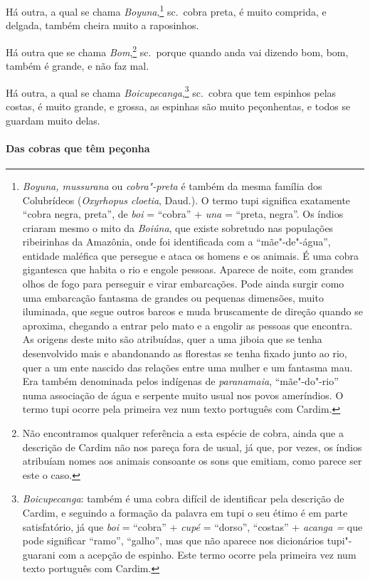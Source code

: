  Há outra, a qual se chama \textit{Boyuna},\footnote{ \textit{Boyuna,
mussurana} ou \textit{cobra"-preta} é também da mesma família dos
Colubrídeos (\textit{Oxyrhopus cloetia}, Daud.). O termo tupi significa
exatamente ``cobra negra, preta'', de \textit{boi} = ``cobra'' +
\textit{una} = ``preta, negra''. Os índios criaram mesmo o mito da
\textit{Boiúna}, que existe sobretudo nas populações ribeirinhas da
Amazônia, onde foi identificada com a ``mãe"-de"-água'', entidade maléfica
que persegue e ataca os homens e os animais. É uma cobra gigantesca que
habita o rio e engole pessoas. Aparece de noite, com grandes olhos de
fogo para perseguir e virar embarcações. Pode ainda surgir como uma
embarcação fantasma de grandes ou pequenas dimensões, muito iluminada,
que segue outros barcos e muda bruscamente de direção quando se
aproxima, chegando a entrar pelo mato e a engolir as pessoas que
encontra. As origens deste mito são atribuídas, quer a uma jiboia que
se tenha desenvolvido mais e abandonando as florestas se tenha fixado
junto ao rio, quer a um ente nascido das relações entre uma mulher e um
fantasma mau. Era também denominada pelos indígenas de
\textit{paranamaia}, ``mãe"-do"-rio'' numa associação de água e serpente
muito usual nos povos ameríndios. O termo tupi ocorre pela primeira vez
num texto português com Cardim.} sc.~cobra preta, é muito comprida, e
delgada, também cheira muito a raposinhos.

 Há outra que se chama \textit{Bom},\footnote{ Não encontramos qualquer
referência a esta espécie de cobra, ainda que a descrição de Cardim não
nos pareça fora de usual, já que, por vezes, os índios atribuíam nomes
aos animais consoante os sons que emitiam, como parece ser este o caso.}
sc.~porque quando anda vai dizendo bom, bom, também é grande, e não faz mal.

 Há outra, a qual se chama \textit{Boicupecanga},\footnote{ \textit{
Boicupecanga}: também é uma cobra difícil de identificar pela
descrição de Cardim, e seguindo a formação da palavra em tupi o seu
étimo é em parte satisfatório, já que \textit{boi} = ``cobra'' +
\textit{cupé} = ``dorso'', ``costas'' + \textit{acanga =} que pode
significar ``ramo'', ``galho'', mas que não aparece nos dicionários 
tupi"-guarani com a acepção de espinho. Este termo ocorre pela primeira
vez num texto português com Cardim.} sc.~cobra que tem espinhos pelas
costas, é muito grande, e grossa, as espinhas são muito peçonhentas, e
todos se guardam muito delas.

\paragraph{Das cobras que têm peçonha}


